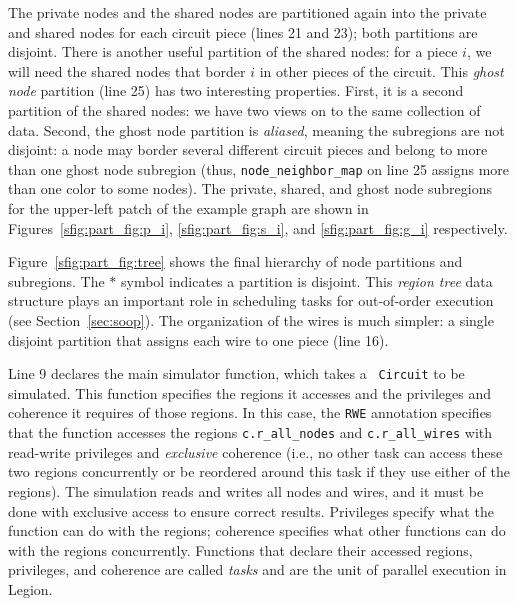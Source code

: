 The private nodes and the shared nodes are partitioned again into the private and shared nodes for each circuit piece (lines 21
and 23);  both partitions are disjoint.  There is another useful partition of the shared nodes:
for a piece $i$, we will need the shared nodes that border $i$ in other pieces of the circuit.
This {\em ghost node} partition (line 25) has two interesting properties.  First, it is a second partition of the shared nodes:
we have two views on to the same collection of data.  Second, the ghost node partition is {\em aliased}, meaning the subregions
are not disjoint: a node may border several different circuit pieces and belong to more than one ghost node subregion (thus, {\tt node\_neighbor\_map} on line 25 assigns more than one color to some nodes).
The private, shared, and ghost node subregions
for the upper-left patch of the example graph are shown in
Figures~\ref{sfig:part_fig:p_i}, \ref{sfig:part_fig:s_i}, and
\ref{sfig:part_fig:g_i} respectively.  

Figure~\ref{sfig:part_fig:tree} shows the final hierarchy of node
partitions and subregions. The $*$ symbol indicates a partition is disjoint. This
{\em region tree} data structure plays an important role in scheduling
tasks for out-of-order execution (see Section~\ref{sec:soop}).
The organization of the wires is much simpler: a single disjoint partition
that assigns each wire to one piece (line 16).

%
%
Line 9 declares the main simulator function, which takes a {\tt
Circuit} to be simulated.  This function specifies the regions it 
accesses and the privileges and coherence it requires of those regions.
In this case, the {\tt RWE} annotation specifies that the function
accesses the regions {\tt c.r\_all\_nodes} and {\tt c.r\_all\_wires}
with read-write privileges and {\em exclusive} coherence (i.e., no other
task can access these two regions concurrently or be reordered around this
task if they use either of the regions).  The simulation 
reads and writes all nodes and wires, and it must be done
with exclusive access to ensure correct results.  Privileges specify what
the function can do with the regions; coherence specifies what other
functions can do with the regions concurrently.  Functions that
declare their accessed regions, privileges, and coherence are called {\em tasks}
and are the unit of parallel execution in Legion.


